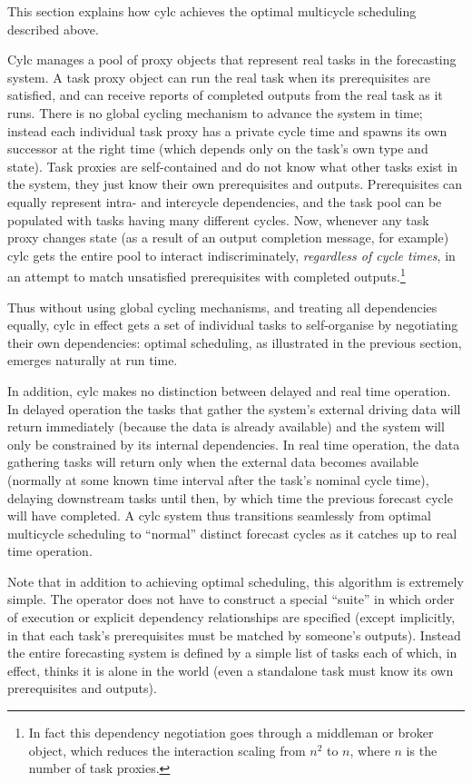 \documentclass[11pt,a4paper]{article}
\begin{document}
This section explains how cylc achieves the optimal multicycle
scheduling described above. 

Cylc manages a pool of proxy objects that represent real tasks in the
forecasting system. A task proxy object can run the real task when its
prerequisites are satisfied, and can receive reports of completed
outputs from the real task as it runs. There is no global cycling
mechanism to advance the system in time; instead each individual task
proxy has a private cycle time and spawns its own successor at the right
time (which depends only on the task's own type and state). Task proxies
are self-contained and do not know what other tasks exist in the system,
they just know their own prerequisites and outputs.  Prerequisites can
equally represent intra- and intercycle dependencies, and the task pool
can be populated with tasks having many different cycles. Now,
whenever any task proxy changes state (as a result of an output
completion message, for example) cylc gets the entire pool to interact
indiscriminately, {\em regardless of cycle times}, in an attempt to
match unsatisfied prerequisites with completed outputs.\footnote{In fact
this dependency negotiation goes through a middleman or broker object,
which reduces the interaction scaling from $n^2$ to $n$, where $n$ is
the number of task proxies.} 

Thus without using global cycling mechanisms, and treating all
dependencies equally, cylc in effect gets a set of individual tasks to
self-organise by negotiating their own dependencies: optimal scheduling,
as illustrated in the previous section, emerges naturally at run time.

In addition, cylc makes no distinction between delayed and real time
operation. In delayed operation the tasks that gather the system's
external driving data will return immediately (because the data is
already available) and the system will only be constrained by its
internal dependencies. In real time operation, the data gathering tasks
will return only when the external data becomes available (normally at
some known time interval after the task's nominal cycle time), delaying
downstream tasks until then, by which time the previous forecast cycle
will have completed. A cylc system thus transitions seamlessly from
optimal multicycle scheduling to ``normal'' distinct forecast cycles as
it catches up to real time operation.

Note that in addition to achieving optimal scheduling, this algorithm is
extremely simple. The operator does not have to construct a special
``suite'' in which order of execution or explicit dependency
relationships are specified (except implicitly, in that each task's
prerequisites must be matched by someone's outputs). Instead the entire
forecasting system is defined by a simple list of tasks each of which,
in effect, thinks it is alone in the world (even a standalone task must
know its own prerequisites and outputs).
\end{document}
